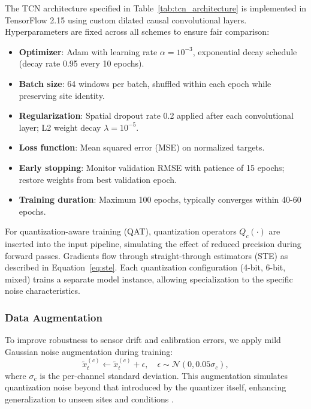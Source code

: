 The TCN architecture specified in Table~\ref{tab:tcn_architecture} is implemented in TensorFlow 2.15 using custom dilated causal convolutional layers. Hyperparameters are fixed across all schemes to ensure fair comparison:

\begin{itemize}
\item \textbf{Optimizer}: Adam with learning rate $\alpha = 10^{-3}$, exponential decay schedule (decay rate 0.95 every 10 epochs).
\item \textbf{Batch size}: 64 windows per batch, shuffled within each epoch while preserving site identity.
\item \textbf{Regularization}: Spatial dropout rate 0.2 applied after each convolutional layer; L2 weight decay $\lambda = 10^{-5}$.
\item \textbf{Loss function}: Mean squared error (MSE) on normalized targets.
\item \textbf{Early stopping}: Monitor validation RMSE with patience of 15 epochs; restore weights from best validation epoch.
\item \textbf{Training duration}: Maximum 100 epochs, typically converges within 40-60 epochs.
\end{itemize}

For quantization-aware training (QAT), quantization operators $Q_c(\cdot)$ are inserted into the input pipeline, simulating the effect of reduced precision during forward passes. Gradients flow through straight-through estimators (STE) as described in Equation~\eqref{eq:ste}. Each quantization configuration (4-bit, 6-bit, mixed) trains a separate model instance, allowing specialization to the specific noise characteristics.

\subsubsection{Data Augmentation}

To improve robustness to sensor drift and calibration errors, we apply mild Gaussian noise augmentation during training:
\begin{equation}
\tilde{x}_t^{(c)} \leftarrow \tilde{x}_t^{(c)} + \epsilon, \quad \epsilon \sim \mathcal{N}(0, 0.05\sigma_c),
\label{eq:augmentation}
\end{equation}
where $\sigma_c$ is the per-channel standard deviation. This augmentation simulates quantization noise beyond that introduced by the quantizer itself, enhancing generalization to unseen sites and conditions \cite{kim2025machine}.

